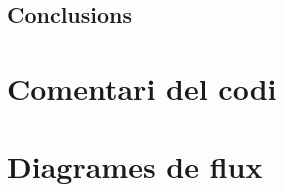\documentclass{../pdae} %
\begin{document}
\subsection{Conclusions}



\section{Comentari del codi}





\section{Diagrames de flux}


\end{document}
